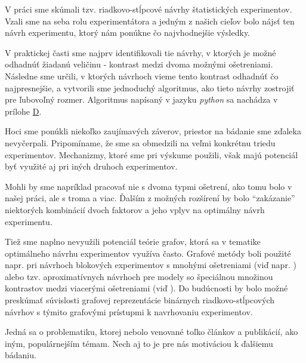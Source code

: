 V práci sme skúmali tzv. riadkovo-stĺpcové návrhy štatistických experimentov. 
Vzali sme na seba rolu experimentátora a jedným z našich cieľov bolo nájsť ten návrh experimentu, ktorý nám ponúkne čo najvhodnejšie výsledky.

V praktickej časti sme najprv identifikovali tie návrhy, v ktorých je možné odhadnúť žiadanú veličinu - kontrast medzi dvoma možnými ošetreniami. 
Následne sme určili, v ktorých návrhoch vieme tento kontrast odhadnúť čo najpresnejšie, a vytvorili sme jednoduchý algoritmus, ako tieto návrhy zostrojiť pre ľubovoľný rozmer. 
Algoritmus napísaný v jazyku \emph{python} sa nachádza v prílohe \hyperref[appendix:d]{D}.

Hoci sme ponúkli niekoľko zaujímavých záverov, priestor na bádanie sme zďaleka nevyčerpali. 
Pripomíname, že sme sa obmedzili na veľmi konkrétnu triedu experimentov. Mechanizmy, ktoré sme pri výskume použili, však majú potenciál byť využité aj pri iných druhoch experimentov.

Mohli by sme napríklad pracovať nie s dvoma typmi ošetrení, ako tomu bolo v našej práci, ale s troma a viac. 
Ďalším z možných rozšírení by bolo “zakázanie” niektorých kombinácií dvoch faktorov a jeho vplyv na optimálny návrh experimentu.

Tiež sme naplno nevyužili potenciál teórie grafov, ktorá sa v tematike optimálneho návrhu experimentov využíva často. 
Grafové metódy boli použité napr. pri návrhoch blokových experimentov s mnohými ošetreniami (viď napr. \cite{cheng, bailey}) 
alebo tzv. aproximatívnych návrhoch pre modely so špeciálnou množinou kontrastov medzi viacerými ošetreniami (viď \cite{rosa}). 
Do budúcnosti by bolo možné preskúmať súvislosti grafovej reprezentácie binárnych riadkovo-stĺpcových návrhov s týmito grafovými prístupmi k navrhovaniu experimentov.

Jedná sa o problematiku, ktorej nebolo venované toľko článkov a publikácií, ako iným, populárnejším témam. 
Nech aj to je pre nás motiváciou k ďalšiemu bádaniu.